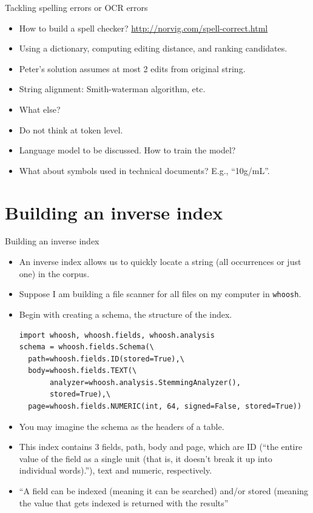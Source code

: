 \documentclass[11pt]{beamer}
\begin{document}
\begin{frame}{Tackling spelling errors or OCR errors}
 \begin{itemize}[<+->]
  \item How to build a spell checker? \url{http://norvig.com/spell-correct.html}
  \item Using a dictionary, computing editing distance, and ranking candidates. 
  \item Peter's solution assumes at most 2 edits from original string. 
  \item String alignment: Smith-waterman algorithm, etc. 
  \item What else? 
  \item Do not think at token level. 
  \item Language model to be discussed. How to train the model? 
  \item What about symbols used in technical documents? E.g., ``10g/mL''. 
 \end{itemize}
\end{frame}

\section{Building an inverse index}

\begin{frame}{Building an inverse index}
\begin{itemize}[<+->]
 \item An inverse index allows us to quickly locate a string (all occurrences or just one) in the corpus. 
 \item Suppose I am building a file scanner for all files on my computer in \texttt{whoosh}.
 \item Begin with creating a schema, the structure of the index.
 {\scriptsize
 \begin{lstlisting}
import whoosh, whoosh.fields, whoosh.analysis
schema = whoosh.fields.Schema(\
  path=whoosh.fields.ID(stored=True),\
  body=whoosh.fields.TEXT(\
       analyzer=whoosh.analysis.StemmingAnalyzer(),
       stored=True),\
  page=whoosh.fields.NUMERIC(int, 64, signed=False, stored=True))
 \end{lstlisting}
 }
\item You may imagine the schema as the headers of a table. 
\item This index contains 3 fields, path, body and page, which are ID (``the entire value of the field as a single unit (that is, it doesn’t break it up into individual words).''), text and numeric, respectively. 

\item ``A field can be indexed (meaning it can be searched) and/or stored (meaning the value that gets indexed is returned with the results'' 
\end{itemize}
\end{frame}
\end{document}
